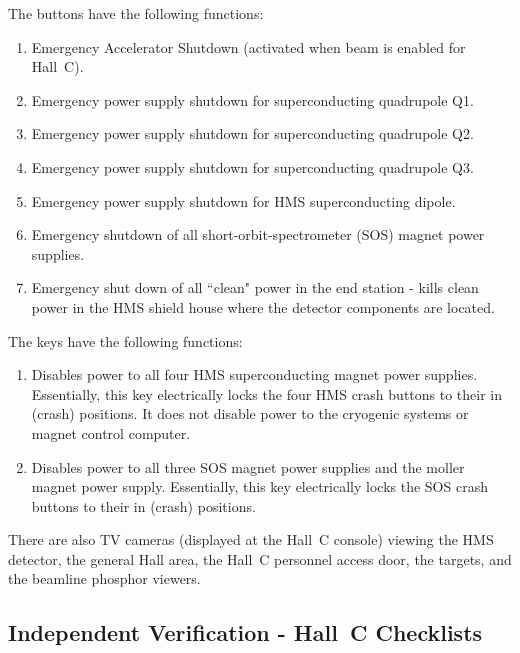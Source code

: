 The buttons have the following functions:

\begin{enumerate}

\item Emergency Accelerator Shutdown (activated when beam is enabled for 
Hall~C).

\item Emergency power supply shutdown for superconducting quadrupole Q1.

\item Emergency power supply shutdown for superconducting quadrupole Q2.

\item Emergency power supply shutdown for superconducting quadrupole Q3.

\item Emergency power supply shutdown for HMS superconducting dipole.

\item Emergency shutdown of all short-orbit-spectrometer (SOS) magnet power
supplies.

\item {Emergency shut down of all ``clean" power in the end station - kills
clean power in the HMS shield house where the detector components are 
located.}
\end{enumerate}

The keys have the following functions:

\begin{enumerate}

\item{Disables power to all four HMS superconducting magnet power 
supplies.  Essentially, this key electrically locks the four HMS crash buttons 
to their in (crash) positions. It 
does not  disable power to the cryogenic systems or magnet control 
computer.}

\item{Disables power to all three SOS magnet power supplies and the moller
magnet power supply. Essentially, this key electrically locks the SOS crash 
buttons to their in (crash) positions.}

\end{enumerate}


There are also TV cameras (displayed at the Hall~C console) viewing the
HMS detector, the general Hall area, the Hall~C personnel access door, the 
targets, and the beamline phosphor viewers.



\subsection{Independent Verification - Hall~C Checklists}


